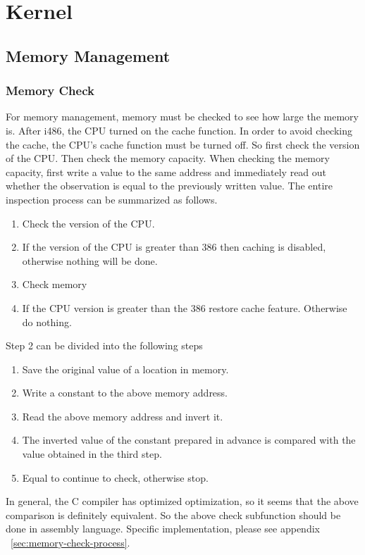\documentclass{swfcthesis}
\begin{document}
\section{Kernel}
\label{sec:kernel-1}

\subsection{Memory Management}
\label{sec:memory-management-2}

\subsubsection{Memory Check}
\label{sec:memory-check}

For memory management, memory must be checked to see how large the memory is. After i486,
the CPU turned on the cache function. In order to avoid checking the cache, the CPU's
cache function must be turned off. So first check the version of the CPU. Then check the
memory capacity. When checking the memory capacity, first write a value to the same
address and immediately read out whether the observation is equal to the previously
written value. The entire inspection process can be summarized as follows.
\begin{enumerate}
\item Check the version of the CPU.
\item If the version of the CPU is greater than 386 then caching is disabled, otherwise
  nothing will be done.
  
\item Check memory
\item If the CPU version is greater than the 386 restore cache feature. Otherwise do
  nothing.
\end{enumerate}
Step 2 can be divided into the following steps
\begin{enumerate}
\item Save the original value of a location in memory.
\item Write a constant to the above memory address.
\item Read the above memory address and invert it.
\item The inverted value of the constant prepared in advance is compared with the value
  obtained in the third step.
\item Equal to continue to check, otherwise stop.
\end{enumerate}
In general, the C compiler has optimized optimization, so it seems that the above
comparison is definitely equivalent. So the above check subfunction should be done in
assembly language. Specific implementation, please see appendix
~\ref{sec:memory-check-process}.
\end{document}
